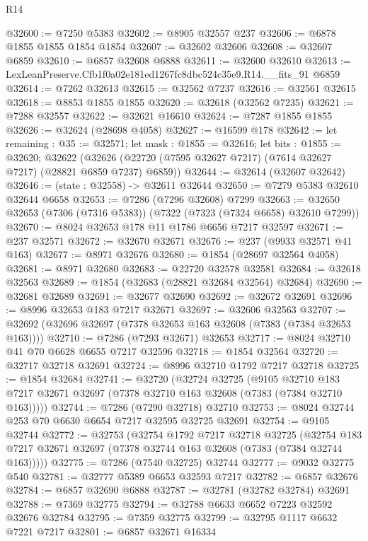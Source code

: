 \begin{lexlean}{R14}
\begin{coremodule}
@32600 := @7250 @5383
@32602 := @8905 @32557 @237
@32606 := @6878 @1855 @1855 @1854 @1854
@32607 := @32602 @32606
@32608 := @32607 @6859
@32610 := @6857 @32608 @6888
@32611 := @32600 @32610
@32613 := LexLeanPreserve.Cfb1f0a02e181ed1267fc8dbc524c35e9.R14.__fits_91 @6859
@32614 := @7262 @32613
@32615 := @32562 @7237
@32616 := @32561 @32615
@32618 := @8853 @1855 @1855
@32620 := @32618 (@32562 @7235)
@32621 := @7288 @32557
@32622 := @32621 @16610
@32624 := @7287 @1855 @1855
@32626 := @32624 (@28698 @4058)
@32627 := @16599 @178
@32642 := let remaining : @35 := @32571;
  let mask : @1855 := @32616;
  let bits : @1855 := @32620;
  @32622 (@32626 (@22720 (@7595 @32627 @7217) (@7614 @32627 @7217) (@28821 @6859 @7237) @6859))
@32644 := @32614 (@32607 @32642)
@32646 := (state : @32558) -> @32611 @32644
@32650 := @7279 @5383 @32610 @32644 @6658
@32653 := @7286 (@7296 @32608) @7299
@32663 := @32650 @32653 (@7306 (@7316 @5383)) (@7322 (@7323 (@7324 @6658) @32610 @7299))
@32670 := @8024 @32653 @178 @11 @1786 @6656 @7217 @32597
@32671 := @237 @32571
@32672 := @32670 @32671
@32676 := @237 (@9933 @32571 @41 @163)
@32677 := @8971 @32676
@32680 := @1854 (@28697 @32564 @4058)
@32681 := @8971 @32680
@32683 := @22720 @32578 @32581
@32684 := @32618 @32563
@32689 := @1854 (@32683 (@28821 @32684 @32564) @32684)
@32690 := @32681 @32689
@32691 := @32677 @32690
@32692 := @32672 @32691
@32696 := @8996 @32653 @183 @7217 @32671
@32697 := @32606 @32563
@32707 := @32692 (@32696 @32697 (@7378 @32653 @163 @32608 (@7383 (@7384 @32653 @163))))
@32710 := @7286 (@7293 @32671) @32653
@32717 := @8024 @32710 @41 @70 @6628 @6655 @7217 @32596
@32718 := @1854 @32564
@32720 := @32717 @32718 @32691
@32724 := @8996 @32710 @1792 @7217 @32718
@32725 := @1854 @32684
@32741 := @32720
    (@32724
      @32725
      (@9105
        @32710
        @183
        @7217
        @32671
        @32697
        (@7378 @32710 @163 @32608 (@7383 (@7384 @32710 @163)))))
@32744 := @7286 (@7290 @32718) @32710
@32753 := @8024 @32744 @253 @70 @6630 @6654 @7217 @32595 @32725 @32691
@32754 := @9105 @32744
@32772 := @32753
    (@32754
      @1792
      @7217
      @32718
      @32725
      (@32754 @183 @7217 @32671 @32697 (@7378 @32744 @163 @32608 (@7383 (@7384 @32744 @163)))))
@32775 := @7286 (@7540 @32725) @32744
@32777 := @9032 @32775 @540
@32781 := @32777 @5389 @6653 @32593 @7217
@32782 := @6857 @32676
@32784 := @6857 @32690 @6888
@32787 := @32781 (@32782 @32784) @32691
@32788 := @7369 @32775
@32794 := @32788 @6633 @6652 @7223 @32592 @32676 @32784
@32795 := @7359 @32775
@32799 := @32795 @1117 @6632 @7221 @7217
@32801 := @6857 @32671 @16334

\end{coremodule}
\end{lexlean}
